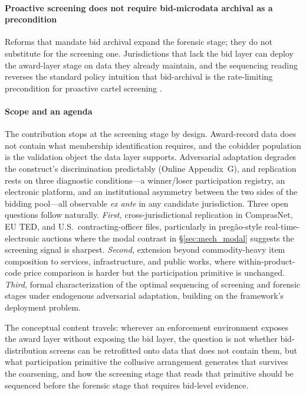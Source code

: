 \paragraph{Proactive screening does not require bid-microdata
archival as a precondition} Reforms that mandate bid archival
expand the forensic stage; they do not substitute for the
screening one. Jurisdictions that lack the bid layer can deploy
the award-layer stage on data they already maintain, and the
sequencing reading reverses the standard policy intuition that
bid-archival is the rate-limiting precondition for proactive
cartel screening
\citep{becker1968crime,stigler1970optimum,baker2002case,harrington2008detecting}.

\paragraph{Scope and an agenda}
The contribution stops at the screening stage by design.
Award-record data does not contain what membership identification
requires, and the cobidder population is the validation object
the data layer supports. Adversarial adaptation degrades the construct's
discrimination predictably (Online Appendix~G), and replication
rests on three diagnostic conditions---a winner/loser
participation registry, an electronic platform, and an
institutional asymmetry between the two sides of the bidding
pool---all observable \emph{ex ante} in any candidate
jurisdiction. Three open questions follow naturally.
\emph{First,} cross-jurisdictional replication in
ComprasNet, EU TED, and U.S.~contracting-officer files,
particularly in pregão-style real-time-electronic auctions
where the modal contrast in §\ref{sec:mech_modal} suggests the
screening signal is sharpest. \emph{Second,} extension beyond
commodity-heavy item composition to services, infrastructure,
and public works, where within-product-code price comparison
is harder but the participation primitive is unchanged.
\emph{Third,} formal characterization of the optimal sequencing
of screening and forensic stages under endogenous adversarial
adaptation, building on the framework's deployment problem.

The conceptual content travels: wherever an enforcement
environment exposes the award layer without exposing the bid
layer, the question is not whether bid-distribution screens can
be retrofitted onto data that does not contain them, but what
participation primitive the collusive arrangement generates that
survives the coarsening, and how the screening stage that reads
that primitive should be sequenced before the forensic stage
that requires bid-level evidence.
